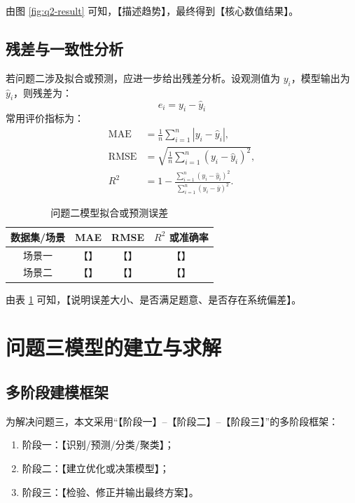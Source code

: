 \documentclass{cumcmthesis}
\begin{document}
由图 \ref{fig:q2-result} 可知，【描述趋势】，最终得到【核心数值结果】。

\subsection{残差与一致性分析}
若问题二涉及拟合或预测，应进一步给出残差分析。设观测值为 $y_i$，模型输出为 $\hat{y}_i$，则残差为：
\begin{equation}
  e_i = y_i-\hat{y}_i
\end{equation}
常用评价指标为：
\begin{align}
  \mathrm{MAE} &= \frac{1}{n}\sum_{i=1}^{n}|y_i-\hat{y}_i|,\\
  \mathrm{RMSE} &= \sqrt{\frac{1}{n}\sum_{i=1}^{n}(y_i-\hat{y}_i)^2},\\
  R^2 &= 1-\frac{\sum_{i=1}^{n}(y_i-\hat{y}_i)^2}{\sum_{i=1}^{n}(y_i-\bar{y})^2}.
\end{align}

\begin{table}[H]
  \centering
  \caption{问题二模型拟合或预测误差}
  \label{tab:q2-error}
  \begin{tabular}{cccc}
    \toprule
    数据集/场景 & MAE & RMSE & $R^2$ 或准确率 \\
    \midrule
    场景一 & 【】 & 【】 & 【】 \\
    场景二 & 【】 & 【】 & 【】 \\
    \bottomrule
  \end{tabular}
\end{table}

由表 \ref{tab:q2-error} 可知，【说明误差大小、是否满足题意、是否存在系统偏差】。

\section{问题三模型的建立与求解}

\subsection{多阶段建模框架}
为解决问题三，本文采用“【阶段一】--【阶段二】--【阶段三】”的多阶段框架：
\begin{enumerate}
  \item 阶段一：【识别/预测/分类/聚类】；
  \item 阶段二：【建立优化或决策模型】；
  \item 阶段三：【检验、修正并输出最终方案】。
\end{enumerate}
\end{document}
